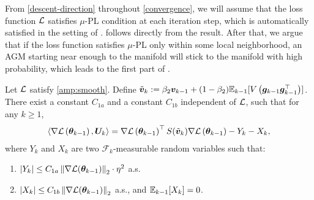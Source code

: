 From \cref{descent-direction} throughout \cref{convergence}, we will assume that the loss function  $\mathcal{L}$ satisfies $\mu$-PL condition at each iteration step, which is automatically satisfied in the setting of . follows directly from the result. After that, we argue that if the loss function satisfies $\mu$-PL only within some local neighborhood, an AGM starting near enough to the manifold will stick to the manifold with high probability, which leads to the first part of . 
\begin{lemma}\label{descent-direction}
    Let $\mathcal{L}$ satisfy \cref{amp:smooth}. Define $\tilde{{\bm{v}}}_{k} := \beta_2 {{\bm{v}}}_{k-1} + (1-\beta_2) \mathbb{E}_{k-1}[V\left({\bm{g}}_{k-1}{\bm{g}}_{k-1}^\top\right)]$. There exist a constant $C_{1a}$ and a constant $C_{1b}$ independent of $\mathcal{L}$, such that for any $k \geq 1$,
  \begin{align*}
\left\langle\nabla\mathcal{L}\left({\bm{\theta}}_{k-1}\right), {\bm{U}}_{k}\right\rangle = \nabla\mathcal{L}\left({\bm{\theta}}_{k-1}\right)^\top S(\tilde{{\bm{v}}}_k) \nabla\mathcal{L}\left({\bm{\theta}}_{k-1}\right) - Y_{k} - X_{k},
\end{align*}
where $Y_k$ and $X_k$ are two $\mathcal{F}_{k}$-measurable random variables such that: \begin{enumerate}
    \item $\left|Y_k\right| \leq C_{1a} \left\|\nabla \mathcal{L}({\bm{\theta}}_{k-1})\right\|_2 \cdot \eta^2$ a.s.
    \item $\left|X_k\right| \leq C_{1b}\left\|\nabla \mathcal{L}({\bm{\theta}}_{k-1})\right\|_2$ a.s., and $ \mathbb{E}_{k-1}[X_k] = 0$.
\end{enumerate}
\end{lemma}
